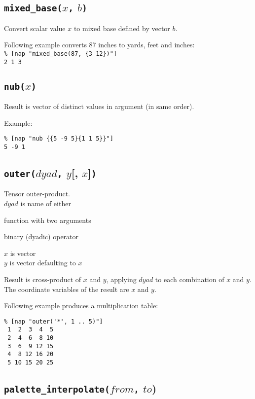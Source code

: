 \subsection{\texttt{mixed\_base(}$x$\texttt{,} $b$\texttt{)}}
    \label{nap-function-lib-mixed-base}

Convert scalar value $x$ to mixed base defined by vector $b$.

Following example converts 87 inches to yards, feet and inches:
  \\
  \texttt{\% [nap "mixed\_base(87, \{3 12\})"]
  \\2 1 3}

\subsection{\texttt{nub(}$x$\texttt{)}}
    \label{nap-function-lib-nub}

Result is vector of distinct values in argument (in same order).

Example:
\begin{verbatim}
% [nap "nub {{5 -9 5}{1 1 5}}"]
5 -9 1
\end{verbatim}

\subsection{\texttt{outer(}$\mathit{dyad}$\texttt{,} $y$[, $x$]\texttt{)}}
    \label{nap-function-lib-outer}

Tensor outer-product.
\\
$\mathit{dyad}$ is name of either
\begin{bullets}
\item function with two arguments
\item binary (dyadic) operator
\end{bullets}
$x$ is vector
\\
$y$ is vector defaulting to $x$

Result is cross-product of $x$ and $y$, applying $\mathit{dyad}$ to each combination of $x$ and $y$.
The coordinate variables of the result are $x$ and $y$. 

Following example produces a multiplication table:
  \begin{verbatim}
% [nap "outer('*', 1 .. 5)"]
 1  2  3  4  5
 2  4  6  8 10
 3  6  9 12 15
 4  8 12 16 20
 5 10 15 20 25
\end{verbatim}

\subsection{\texttt{palette\_interpolate(}$\mathit{from}$\texttt{,} $\mathit{to}$)}
    \label{nap-function-lib-palette-interpolate}

